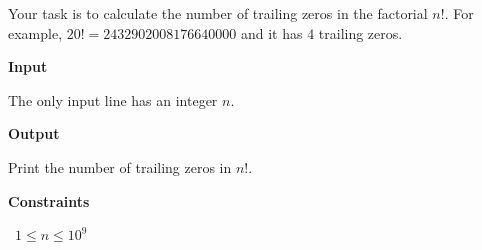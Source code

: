 Your task is to calculate the number of trailing zeros in the factorial $n!$.
For example, $20!=2432902008176640000$ and it has $4$ trailing zeros.

\vspace{0.3cm}\noindent\textbf{Input}

The only input line has an integer $n$.

\vspace{0.3cm}\noindent\textbf{Output}

Print the number of trailing zeros in $n!$.

\vspace{0.3cm}\noindent\textbf{Constraints}

\textbullet\ $1 \le n \le 10^9$